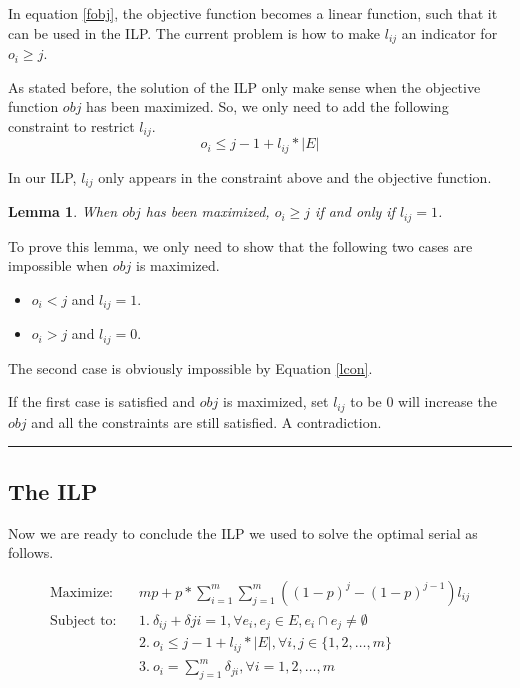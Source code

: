 \documentclass[letterpaper]{article}
\newenvironment{proof}{{Proof:}}{\hfill\rule{2mm}{2mm}}
\newtheorem{lemma}{Lemma}
\begin{document}
In equation \ref{fobj}, the objective function becomes a linear function, such that it can be used in the ILP.
The current problem is how to make $l_{ij}$ an indicator for $o_i\geq j$.

As stated before, the solution of the ILP only make sense when the objective function $obj$ has been maximized.
So, we only need to add the following constraint to restrict $l_{ij}$.
\begin{equation}
o_i\leq j-1+l_{ij}*|E|\label{lcon}
\end{equation}

In our ILP, $l_{ij}$ only appears in the constraint above and the objective function.

\begin{lemma}\label{lmm}
	When $obj$ has been maximized, $o_i\geq j$ if and only if $l_{ij}=1$.
\end{lemma}
\begin{proof}
	To prove this lemma, we only need to show that the following two cases are impossible when $obj$ is maximized.
	\begin{itemize}
		\item $o_i<j$ and $l_{ij}=1$.
		\item $o_i>j$ and $l_{ij}=0$.
	\end{itemize}
	The second case is obviously impossible by Equation \ref{lcon}.
	
	If the first case is satisfied and $obj$ is maximized, set $l_{ij}$ to be 0 will increase the $obj$ and all the constraints are still satisfied. A contradiction.
\end{proof}

\subsection{The ILP}
Now we are ready to conclude the ILP we used to solve the optimal serial as follows.

\begin{eqnarray}
\text{Maximize:}&& mp+p*\sum_{i=1}^{m}\sum_{j=1}^{m}((1-p)^j-(1-p)^{j-1})l_{ij}\nonumber\\
\text{Subject to:}&& 1.~\delta_{ij}+\delta{ji}=1, \forall e_i,e_j\in E, e_i\cap e_j\neq \emptyset \label{con1}\\
&& 2.~o_i\leq j-1+l_{ij}*|E|, \forall i,j\in \{1,2,\ldots,m\}\nonumber\\
&& 3.~o_i=\sum_{j=1}^{m}\delta_{ji}, \forall i=1,2,\ldots,m \nonumber
\end{eqnarray}
\end{document}
